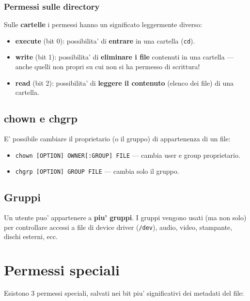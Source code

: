 \subsubsection{Permessi sulle directory}
Sulle \textbf{cartelle} i permessi hanno un significato leggermente diverso:
\begin{itemize}
  \item \textbf{execute} (bit 0): possibilita' di \textbf{entrare} in una cartella (\texttt{cd}).
  \item \textbf{write} (bit 1): possibilita' di \textbf{eliminare i file} contenuti in una cartella --- anche quelli non propri su cui non si ha permesso di scrittura!
  \item \textbf{read} (bit 2): possibilita' di \textbf{leggere il contenuto} (elenco dei file) di una cartella.
\end{itemize}

\subsection{chown e chgrp}
E' possibile cambiare il proprietario (o il gruppo) di appartenenza di un file:
\begin{itemize}
  \item \texttt{chown [OPTION] OWNER[:GROUP] FILE} — cambia user e group proprietario.
  \item \texttt{chgrp [OPTION] GROUP FILE} — cambia solo il gruppo.
\end{itemize}

\subsection{Gruppi}
Un utente puo' appartenere a \textbf{piu' gruppi}. I gruppi vengono usati (ma non solo) per controllare accessi a file di device driver (\texttt{/dev}), audio, video, stampante, dischi esterni, ecc.

\section{Permessi speciali}
Esistono 3 permessi speciali, salvati nei bit piu' significativi dei metadati del file:

